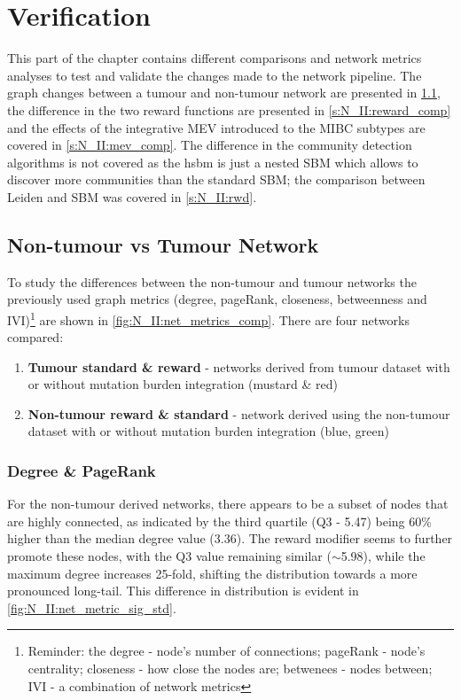 \section{Verification} \label{s:N_II:validation}


This part of the chapter contains different comparisons and network metrics analyses to test and validate the changes made to the network pipeline. The graph changes between a tumour and non-tumour network are presented in \cref{s:N_II:net_comp}, the difference in the two reward functions are presented in \cref{s:N_II:reward_comp} and the effects of the integrative MEV introduced to the MIBC subtypes are covered in \cref{s:N_II:mev_comp}. The difference in the community detection algorithms is not covered as the \acrfull{hsbm} is just a nested SBM which allows to discover more communities than the standard SBM; the comparison between Leiden and SBM was covered in \cref{s:N_II:rwd}.


\subsection{Non-tumour vs Tumour Network} \label{s:N_II:net_comp}

To study the differences between the non-tumour and tumour networks the previously used graph metrics (degree, pageRank, closeness, betweenness and IVI)\footnote{Reminder: the degree - node's number of connections; pageRank - node's centrality;  closeness - how close the nodes are; betwenees - nodes between; IVI - a combination of network metrics} are shown in \cref{fig:N_II:net_metrics_comp}. There are four networks compared:
\begin{enumerate}
    \item \textbf{Tumour standard \& reward} - networks derived from tumour dataset with or without mutation burden integration (mustard \& red)
    \item \textbf{Non-tumour reward \& standard} - network derived using the non-tumour dataset with or without mutation burden integration (blue, green)
\end{enumerate}


\subsubsection*{Degree \& PageRank}

For the non-tumour derived networks, there appears to be a subset of nodes that are highly connected, as indicated by the third quartile (Q3 - 5.47) being 60\% higher than the median degree value (3.36). The reward modifier seems to further promote these nodes, with the Q3 value remaining similar ($\sim$5.98), while the maximum degree increases 25-fold, shifting the distribution towards a more pronounced long-tail. This difference in distribution is evident in \cref{fig:N_II:net_metric_sig_std}.

